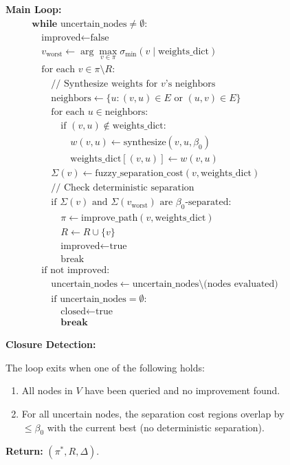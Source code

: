 \documentclass[twocolumn,11pt,a4paper]{article}
\theoremstyle{definition}
\begin{document}
\begin{figure}[h]
{{\textbf{Main Loop:}
\begin{align}
&\textbf{while } \text{uncertain\_nodes} \neq \emptyset: \\
&\quad \text{improved} \leftarrow \text{false} \\
&\quad v_{\text{worst}} \leftarrow \arg\max_{v \in \pi} \sigma_{\min}(v \mid \text{weights\_dict}) \\
&\quad \text{for each } v \in \pi \setminus R: \\
&\quad\quad \text{// Synthesize weights for $v$'s neighbors} \\
&\quad\quad \text{neighbors} \leftarrow \{u : (v, u) \in E \text{ or } (u, v) \in E\} \\
&\quad\quad \text{for each } u \in \text{neighbors}: \\
&\quad\quad\quad \text{if } (v, u) \notin \text{weights\_dict}: \\
&\quad\quad\quad\quad w(v, u) \leftarrow \text{synthesize}(v, u, \beta_0) \\
&\quad\quad\quad\quad \text{weights\_dict}[(v, u)] \leftarrow w(v, u) \\
&\quad\quad \Sigma(v) \leftarrow \text{fuzzy\_separation\_cost}(v, \text{weights\_dict}) \\
&\quad\quad \text{// Check deterministic separation} \\
&\quad\quad \text{if } \Sigma(v) \text{ and } \Sigma(v_{\text{worst}}) \text{ are } \beta_0\text{-separated}: \\
&\quad\quad\quad \pi \leftarrow \text{improve\_path}(v, \text{weights\_dict}) \\
&\quad\quad\quad R \leftarrow R \cup \{v\} \\
&\quad\quad\quad \text{improved} \leftarrow \text{true} \\
&\quad\quad\quad \text{break} \\
&\quad \text{if not improved:} \\
&\quad\quad \text{uncertain\_nodes} \leftarrow \text{uncertain\_nodes} \setminus \text{(nodes evaluated)} \\
&\quad\quad \text{if } \text{uncertain\_nodes} = \emptyset: \\
&\quad\quad\quad \text{closed} \leftarrow \text{true} \\
&\quad\quad\quad \textbf{break}
\end{align}

\textbf{Closure Detection:}

The loop exits when one of the following holds:
\begin{enumerate}
\item All nodes in $V$ have been queried and no improvement found.
\item For all uncertain nodes, the separation cost regions overlap by $\leq \beta_0$ with the current best (no deterministic separation).
\end{enumerate}

\textbf{Return:} $(\pi^*, R, \Delta)$.
}}
\end{figure}
\end{document}
